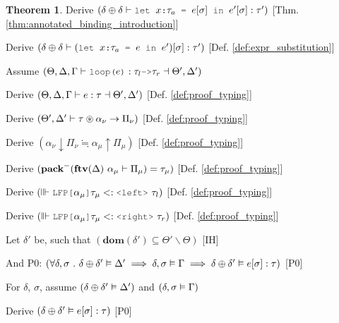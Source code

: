 \documentclass[acmsmall]{acmart}
\theoremstyle{definition}
\newtheorem{theorem}{Theorem}[section]
\begin{document}
\begin{theorem}
  \item \I\I \N Derive $(
    \delta \oplus \delta \entails \J{let } x \J{:} \tau_a \J{ = } e[\sigma] \J{ in } e'[\sigma] \hastype \tau'
  )$ [Thm. \ref{thm:annotated_binding_introduction}]

  \item \I\I \N Derive $(
    \delta \oplus \delta \entails (\J{let } x \J{:} \tau_a \J{ = } e \J{ in } e')[\sigma] \hastype \tau'
  )$ [Def. \ref{def:expr_substitution}]


  \item \N Assume $(
    \Theta, \Delta, \Gamma \entails \J{loop(}e\J{)} \hastype 
    \tau_l \J{->} \tau_r \given \Theta', \Delta'
  )$
  \item \I \N Derive $(
    \Theta, \Delta, \Gamma \vdash e : \tau \dashv  \Theta', \Delta'
  )$ [Def. \ref{def:proof_typing}]
  \item \I \N Derive $(
    \Theta', \Delta' \vdash \tau \circledast \alpha_\nu \rightarrow \Pi_\nu
  )$ [Def. \ref{def:proof_typing}]
  \item \I \N Derive $(
    \alpha_\nu \downarrow \Pi_\nu \fallingdotseq \alpha_\mu \uparrow \Pi_\mu
  )$ [Def. \ref{def:proof_typing}]
  \item \I \N Derive $(
    \textbf{pack}^-(\textbf{ftv}(\Delta)\ \alpha_\mu \vdash \Pi_\mu) = \tau_\mu
  )$ [Def. \ref{def:proof_typing}]
  \item \I \N Derive $(
    \factorsinto \J{LFP[} \alpha_\mu \J{]}\tau_\mu \subtypes \J{<left>}\ \tau_l
  )$ [Def. \ref{def:proof_typing}]
  \item \I \N Derive $(
    \factorsinto \J{LFP[} \alpha_\mu \J{]}\tau_\mu \subtypes \J{<right>}\ \tau_r
  )$ [Def. \ref{def:proof_typing}]

  \item \I \N Let $\delta'$ be, such that $(
    \textbf{dom}(\delta') \subseteq \Theta' \backslash \Theta
  )$ [IH]
  \item \I \N And P0: $(
    \forall \delta, \sigma \ .\  
    \delta \oplus \delta' \vDash \Delta' \implies
    \delta, \sigma \vDash \Gamma \implies
    \delta \oplus \delta' \vDash e[\sigma] : \tau
  )$ [P0]

  \item \I \N For $\delta$, $\sigma$,
    assume $(\delta \oplus \delta' \vDash \Delta')$
    and $(\delta, \sigma \vDash \Gamma)$

  \item \I\I \N Derive $(
    \delta \oplus \delta' \vDash e[\sigma] : \tau
  )$ [P0]


\end{theorem}
\end{document}
